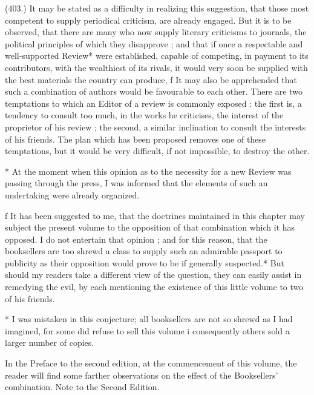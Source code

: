 \documentclass{article}
\begin{document}
(403.) It may be stated as a difficulty in realizing this suggestion, that those most competent to supply periodical criticism, are already engaged. But it is to be observed, that there are many who now supply literary criticisms to journals, the political principles of which they disapprove ; and that if once a respectable and well-supported Review* were established, capable of competing, in payment to its contributors, with the wealthiest of its rivals, it would very soon be supplied with the best materials the country can produce, f It may also be apprehended that such a combination of authors would be favourable to each other. There are two temptations to which an Editor of a review is commonly exposed : the first is, a tendency to consult too much, in the works he criticises, the interest of the proprietor of his review ; the second, a similar inclination to consult the interests of his friends. The plan which has been proposed removes one of these temptations, but it would be very difficult, if not impossible, to destroy the other.


* At the moment when this opinion as to the necessity for a new Review was passing through the press, I was informed that the elements of such an undertaking were already organized.


f It has been suggested to me, that the doctrines maintained in this chapter may subject the present volume to the opposition of that combination which it has opposed. I do not entertain that opinion ; and for this reason, that the booksellers are too shrewd a class to supply such an admirable passport to publicity as their opposition would prove to be if generally suspected.* But should my readers take a different view of the question, they can easily assist in remedying the evil, by each mentioning the existence of this little volume to two of his friends.


* I was mistaken in this conjecture; all booksellers are not so shrewd as I had imagined, for some did refuse to sell this volume i consequently others sold a larger number of copies.


In the Preface to the second edition, at the commencement of this volume, the reader will find some farther observations on the effect of the Booksellers' combination. Note to the Second Edition.
\end{document}
